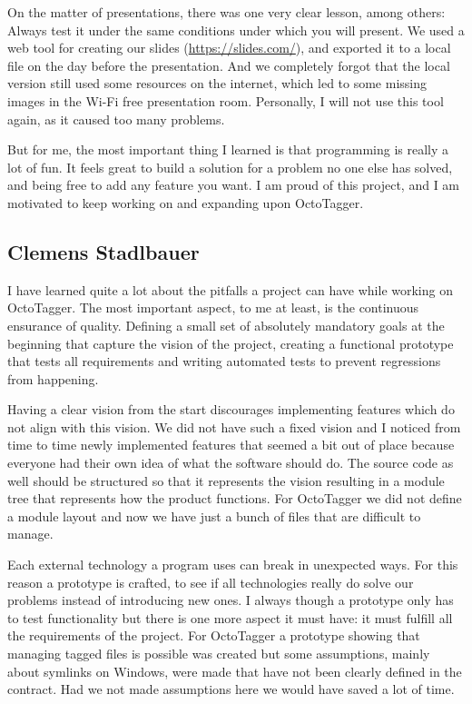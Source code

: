 On the matter of presentations, there was one very clear lesson, among others:
Always test it under the same conditions under which you will present. We used a
web tool for creating our slides (\url{https://slides.com/}), and exported it to
a local file on the day before the presentation. And we completely forgot that
the local version still used some resources on the internet, which led to some
missing images in the Wi-Fi free presentation room. Personally, I will not use
this tool again, as it caused too many problems.

But for me, the most important thing I learned is that programming is really a
lot of fun. It feels great to build a solution for a problem no one else has
solved, and being free to add any feature you want. I am proud of this project,
and I am motivated to keep working on and expanding upon OctoTagger.

\subsection{Clemens Stadlbauer}

I have learned quite a lot about the pitfalls a project can have while working
on OctoTagger. The most important aspect, to me at least, is the continuous
ensurance of quality. Defining a small set of absolutely mandatory goals at the
beginning that capture the vision of the project, creating a functional
prototype that tests all requirements and writing automated tests to prevent
regressions from happening.

Having a clear vision from the start discourages implementing features which do
not align with this vision. We did not have such a fixed vision and I noticed
from time to time newly implemented features that seemed a bit out of place
because everyone had their own idea of what the software should do. The source
code as well should be structured so that it represents the vision resulting
in a module tree that represents how the product functions. For OctoTagger we
did not define a module layout and now we have just a bunch of files that are
difficult to manage.

Each external technology a program uses can break in unexpected ways. For this
reason a prototype is crafted, to see if all technologies really do solve our
problems instead of introducing new ones. I always though a prototype only has
to test functionality but there is one more aspect it must have: it must fulfill
all the requirements of the project. For OctoTagger a prototype showing that
managing tagged files is possible was created but some assumptions, mainly about
symlinks on Windows, were made that have not been clearly defined in the
contract. Had we not made assumptions here we would have saved a lot of time.

